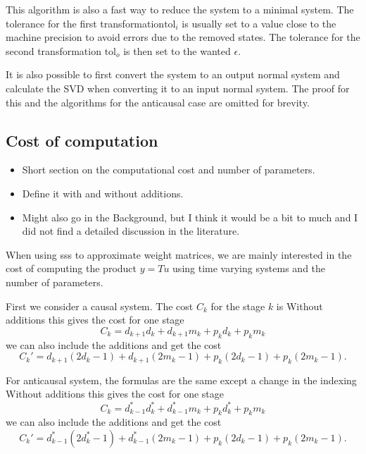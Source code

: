 \documentclass[doctype=mastersthesis,BCOR=15mm,biblatex]{ldvbook}%
\newcommand{\da}{d^*} %
\begin{document}
\begin{itemize}
This algorithm is also a fast way to reduce the system to a minimal system.
The tolerance for the first transformation$\text{tol}_i$ is usually set to a value close to the machine precision to avoid errors due to the removed states.
The tolerance for the second transformation $\text{tol}_o$ is then set to the wanted $\epsilon$.
 
It is also possible to first convert the system to an output normal system and calculate the SVD when converting it to an input normal system.
The proof for this and the algorithms for the anticausal case are omitted for brevity.

 
 

\end{itemize}
\subsection{Cost of computation}
\begin{itemize}
\item Short section on the computational cost and number of parameters.

\item Define it with and without additions.

\item Might also go in the Background, but I think it would be a bit to much and I did not find a detailed discussion in the literature. 
\end{itemize}

When using sss to approximate weight matrices, we are mainly interested in the cost of computing the product $y = Tu$ using time varying systems and the number of parameters.

First we consider a causal system.
The cost $C_k$ for the stage $k$ is 
Without additions this gives the cost for one stage
\begin{equation}
	C_k = d_{k+1}d_k + d_{k+1}m_k+p_kd_k+p_km_k 
\end{equation}
 we can also include the additions and get the cost
 \begin{equation}
 	C_k' = d_{k+1}(2d_k-1) + d_{k+1}(2m_k-1)+p_k(2d_k-1)+p_k(2m_k-1).
 \end{equation}


For anticausal system, the formulas are the same except a change in the indexing 
Without additions this gives the cost for one stage
\begin{equation}
C_k = \da_{k-1}\da_k + \da_{k-1}m_k+p_k \da_k+p_km_k 
\end{equation}
we can also include the additions and get the cost
\begin{equation}
C_k' = \da_{k-1}(2\da_k-1) + \da_{k-1}(2m_k-1)+p_k(2d_k-1)+p_k(2m_k-1).
\end{equation}
\end{document}
